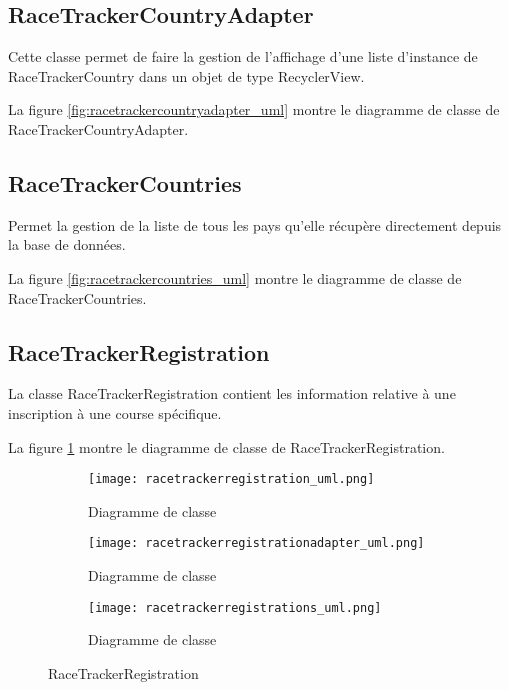 \subsection{RaceTrackerCountryAdapter}

Cette classe permet de faire la gestion de l'affichage d'une liste d'instance de RaceTrackerCountry dans un objet de type RecyclerView.

La figure \ref{fig:racetrackercountryadapter_uml} montre le diagramme de classe de RaceTrackerCountryAdapter.

\subsection{RaceTrackerCountries}

Permet la gestion de la liste de tous les pays qu'elle récupère directement depuis la base de données.

La figure \ref{fig:racetrackercountries_uml} montre le diagramme de classe de RaceTrackerCountries.

\subsection{RaceTrackerRegistration}

La classe RaceTrackerRegistration contient les information relative à une inscription à une course spécifique.

La figure \ref{fig:racetrackerregistration_uml} montre le diagramme de classe de RaceTrackerRegistration.

\begin{figure}[htb!]
    \centering
    \begin{subfigure}[htb]{1\textwidth}
		\texttt{[image: racetrackerregistration\_uml.png]} 
		\caption{Diagramme de classe}
		\label{fig:racetrackerregistration_uml}
    \end{subfigure}
    \begin{subfigure}[htb]{1\textwidth}
		\texttt{[image: racetrackerregistrationadapter\_uml.png]} 
		\caption{Diagramme de classe}
		\label{fig:racetrackerregistrationadapter_uml}
    \end{subfigure}
    \begin{subfigure}[htb]{1\textwidth}
		\texttt{[image: racetrackerregistrations\_uml.png]} 
		\caption{Diagramme de classe}
		\label{fig:racetrackerregistrations_uml}
    \end{subfigure}
    \caption{RaceTrackerRegistration}\label{fig:racetrackerregistration_fig}
\end{figure}

